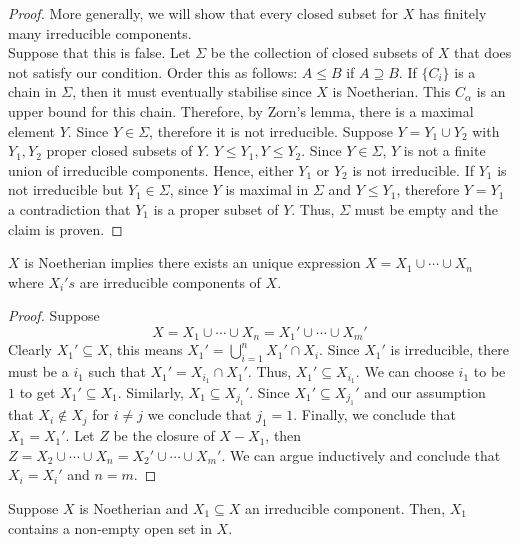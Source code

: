 \documentclass[oneside, 12pt]{scrbook}
\theoremstyle{theorem}
\begin{document}
\begin{proof}
More generally, we will show that every closed subset for $X$ has finitely many irreducible components. \\

Suppose that this is false. Let $\Sigma$ be the collection of closed subsets of $X$ that does not satisfy our condition. Order this as follows: $A \le B$ if $A \supseteq B$. If $\{C_{i}\}$ is a chain in $\Sigma$, then it must eventually stabilise since $X$ is Noetherian. This $C_{\alpha}$ is an upper bound for this chain. Therefore, by Zorn's lemma, there is a maximal element $Y$. Since $Y \in \Sigma$, therefore it is not irreducible. Suppose $Y = Y_{1} \cup Y_{2}$ with $Y_{1},Y_{2}$ proper closed subsets of $Y$. $Y \le Y_{1}, Y \le Y_{2}$. Since $Y \in \Sigma$, $Y$ is not a finite union of irreducible components. Hence, either $Y_{1}$ or $Y_{2}$ is not irreducible. If $Y_{1}$ is not irreducible but $Y_{1} \in \Sigma$, since $Y$ is maximal in $\Sigma$ and $Y \le Y_{1}$, therefore $Y =Y_{1}$ a contradiction that $Y_{1}$ is a proper subset of $Y$. Thus, $\Sigma$ must be empty and the claim is proven. 
\end{proof}

\begin{lemma}
$X$ is Noetherian implies there exists an unique expression $X = X_{1} \cup \cdots \cup X_{n}$ where $X_{i}'s$ are irreducible components of $X$.
\end{lemma}

\begin{proof}
Suppose $$X = X_{1} \cup \cdots \cup X_{n} = X_{1}' \cup \cdots \cup X_{m}'$$ Clearly $X_{1}' \subseteq X$, this means $X_{1}' = \bigcup_{i=1}^n X_{1}' \cap X_{i}$. Since $X_{1}'$ is irreducible, there must be a $i_{1}$ such that $X_{1}' = X_{i_{1}} \cap X_{1}'$. Thus, $X_{1}' \subseteq X_{i_{1}}$. We can choose $i_{1}$ to be $1$ to get $X_{1}' \subseteq X_{1}$. Similarly, $X_{1} \subseteq X_{j_{1}}'$. Since $X_{1}' \subseteq X_{j_{1}}'$ and our assumption that $X_{i} \not \in X_{j}$ for $i \neq j$ we conclude that $j_{1}=1$. Finally, we conclude that $X_{1}=X_{1}'$. Let $Z$ be the closure of $X - X_{1}$, then $Z = X_{2} \cup \cdots \cup X_{n} = X_{2}' \cup \cdots \cup X_{m}' $. We can argue inductively and conclude that $X_{i} = X_{i}'$ and $n=m$. 
\end{proof}

\begin{lemma}
Suppose $X$ is Noetherian and $X_{1} \subseteq X$ an irreducible component. Then, $X_{1}$ contains a non-empty open set in $X$.
\end{lemma}
\end{document}
